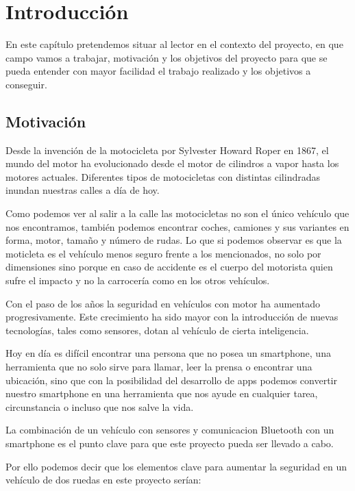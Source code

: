 \chapter{Introducci\'on}\label{cap.introduccion}
	
		En este cap\'itulo pretendemos situar al lector en el contexto del proyecto, en que campo vamos a trabajar, motivaci\'on y los objetivos del proyecto para que se pueda entender con mayor facilidad el trabajo realizado y los objetivos a conseguir.
		
	\section{Motivaci\'on}
	
		Desde la invenci\'on de la motocicleta por Sylvester Howard Roper en 1867, el mundo del motor ha evolucionado desde el motor de cilindros a vapor hasta los motores actuales. Diferentes tipos de motocicletas con distintas cilindradas inundan nuestras calles a d\'ia de hoy.
		
		Como podemos ver al salir a la calle las motocicletas no son el \'unico veh\'iculo que nos encontramos, tambi\'en podemos encontrar coches, camiones y sus variantes en forma, motor, tama\~no y n\'umero de rudas. Lo que si podemos observar es que la moticleta es el veh\'iculo menos seguro frente a los mencionados, no solo por dimensiones sino porque en caso de accidente es el cuerpo del motorista quien sufre el impacto y no la carrocer\'ia como en los otros veh\'iculos.
		
		Con el paso de los a\~nos la seguridad en veh\'iculos con motor ha aumentado progresivamente. Este crecimiento ha sido mayor con la introducci\'on de nuevas tecnolog\'ias, tales como sensores, dotan al veh\'iculo de cierta inteligencia.
		
		Hoy en d\'ia es dif\'icil encontrar una persona que no posea un smartphone, una herramienta que no solo sirve para llamar, leer la prensa o encontrar una ubicaci\'on, sino que con la posibilidad del desarrollo de apps podemos convertir nuestro smartphone en una herramienta que nos ayude en cualquier tarea, circunstancia o incluso que nos salve la vida.
		
		La combinaci\'on de un veh\'iculo con sensores y comunicacion Bluetooth con un smartphone es el punto clave para que este proyecto pueda ser llevado a cabo.
		
		Por ello podemos decir que los elementos clave para aumentar la seguridad en un veh\'iculo de dos ruedas en este proyecto ser\'ian:

